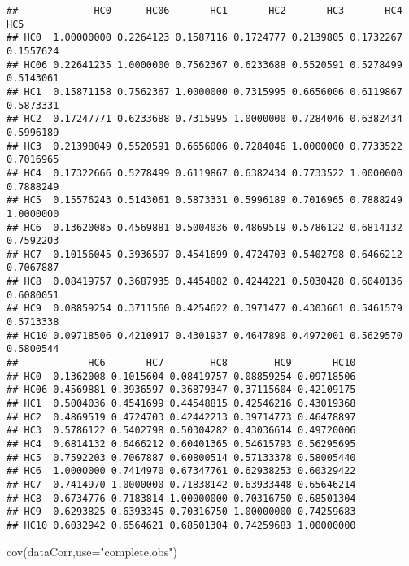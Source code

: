 \documentclass[
]{article}
\newenvironment{Shaded}{\begin{snugshade}}{\end{snugshade}}
\newcommand{\AttributeTok}[1]{\textcolor[rgb]{0.77,0.63,0.00}{#1}}
\newcommand{\FunctionTok}[1]{\textcolor[rgb]{0.00,0.00,0.00}{#1}}
\newcommand{\NormalTok}[1]{#1}
\newcommand{\StringTok}[1]{\textcolor[rgb]{0.31,0.60,0.02}{#1}}
\begin{document}
\begin{verbatim}
##             HC0      HC06       HC1       HC2       HC3       HC4       HC5
## HC0  1.00000000 0.2264123 0.1587116 0.1724777 0.2139805 0.1732267 0.1557624
## HC06 0.22641235 1.0000000 0.7562367 0.6233688 0.5520591 0.5278499 0.5143061
## HC1  0.15871158 0.7562367 1.0000000 0.7315995 0.6656006 0.6119867 0.5873331
## HC2  0.17247771 0.6233688 0.7315995 1.0000000 0.7284046 0.6382434 0.5996189
## HC3  0.21398049 0.5520591 0.6656006 0.7284046 1.0000000 0.7733522 0.7016965
## HC4  0.17322666 0.5278499 0.6119867 0.6382434 0.7733522 1.0000000 0.7888249
## HC5  0.15576243 0.5143061 0.5873331 0.5996189 0.7016965 0.7888249 1.0000000
## HC6  0.13620085 0.4569881 0.5004036 0.4869519 0.5786122 0.6814132 0.7592203
## HC7  0.10156045 0.3936597 0.4541699 0.4724703 0.5402798 0.6466212 0.7067887
## HC8  0.08419757 0.3687935 0.4454882 0.4244221 0.5030428 0.6040136 0.6080051
## HC9  0.08859254 0.3711560 0.4254622 0.3971477 0.4303661 0.5461579 0.5713338
## HC10 0.09718506 0.4210917 0.4301937 0.4647890 0.4972001 0.5629570 0.5800544
##            HC6       HC7        HC8        HC9       HC10
## HC0  0.1362008 0.1015604 0.08419757 0.08859254 0.09718506
## HC06 0.4569881 0.3936597 0.36879347 0.37115604 0.42109175
## HC1  0.5004036 0.4541699 0.44548815 0.42546216 0.43019368
## HC2  0.4869519 0.4724703 0.42442213 0.39714773 0.46478897
## HC3  0.5786122 0.5402798 0.50304282 0.43036614 0.49720006
## HC4  0.6814132 0.6466212 0.60401365 0.54615793 0.56295695
## HC5  0.7592203 0.7067887 0.60800514 0.57133378 0.58005440
## HC6  1.0000000 0.7414970 0.67347761 0.62938253 0.60329422
## HC7  0.7414970 1.0000000 0.71838142 0.63933448 0.65646214
## HC8  0.6734776 0.7183814 1.00000000 0.70316750 0.68501304
## HC9  0.6293825 0.6393345 0.70316750 1.00000000 0.74259683
## HC10 0.6032942 0.6564621 0.68501304 0.74259683 1.00000000
\end{verbatim}

\begin{Shaded}
\begin{Highlighting}[]
\FunctionTok{cov}\NormalTok{(dataCorr,}\AttributeTok{use=}\StringTok{"complete.obs"}\NormalTok{)}
\end{Highlighting}
\end{Shaded}
\end{document}
